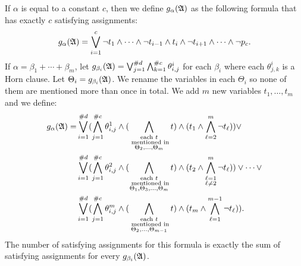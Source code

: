 If $\alpha$ is equal to a constant $c$, then we define $g_{\alpha}(\mathfrak{A})$ as the following formula that has exactly $c$ satisfying assignments:
$$
g_{\alpha}(\mathfrak{A}) = \bigvee_{i = 1}^{c}\neg t_1 \wedge \cdots \wedge \neg t_{i-1} \wedge t_i \wedge \neg t_{i+1} \wedge \cdots \wedge \neg p_c.
$$ 
If $\alpha = \beta_1 + \cdots + \beta_m$, let $g_{\beta_i}(\mathfrak{A}) = \bigvee_{j = 1}^{\#d}\bigwedge_{k = 1}^{\#c}\theta^i_{i,j}$ for each $\beta_i$ where each $\theta^i_{j,k}$ is a Horn clause. Let $\Theta_i = g_{\beta_i}(\mathfrak{A})$. We rename the variables in each $\Theta_i$ so none of them are mentioned more than once in total. We add $m$ new variables $t_1,\ldots,t_m$ and we define:
\begin{align*}
g_{\alpha}(\mathfrak{A}) = &\bigvee_{i = 1}^{\#d}(\bigwedge_{j = 1}^{\#c}\theta^1_{i,j} \wedge (\bigwedge\limits_{\substack{\text{each } t\\ \text{ mentioned in}\\ \Theta_2,\ldots,\Theta_{m}}}t) \wedge (t_1 \wedge \bigwedge_{\ell = 2}^{m} \neg t_{\ell})) \vee \\ 
&\bigvee_{i = 1}^{\#d}(\bigwedge_{j = 1}^{\#c}\theta^2_{i,j} \wedge (\bigwedge\limits_{\substack{\text{each $t$}\\ \text{ mentioned in}\\ \Theta_1,\Theta_3,\ldots,\Theta_{m}}}t) \wedge (t_2 \wedge \bigwedge\limits_{\substack{\ell = 1 \\ \ell \neq 2}}^{m} \neg t_{\ell})) \vee \cdots \vee\\ 
&\bigvee_{i = 1}^{\#d}(\bigwedge_{j = 1}^{\#c}\theta^m_{i,j} \wedge (\bigwedge\limits_{\substack{\text{each } t\\ \text{ mentioned in}\\ \Theta_2,\ldots,\Theta_{m-1}}}t) \wedge (t_m \wedge \bigwedge_{\ell = 1}^{m-1} \neg t_{\ell})).
\end{align*}
The number of satisfying assignments for this formula is exactly the sum of satisfying assignments for every $g_{\beta_i}(\mathfrak{A})$.

